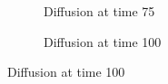 \documentclass[paper=a4, fontsize=11pt]{scrartcl} %
\numberwithin{equation}{section} %
\numberwithin{figure}{section} %
\numberwithin{table}{section} %
\begin{document}
\begin{figure}[H]
\begin{subfigure}[b]{0.45\textwidth}
		\noindent{}
	\caption{Diffusion at time 75}
	\end{subfigure}
	\hspace{5mm}
	\begin{subfigure}[b]{0.45\textwidth}
		\noindent{}
	\caption{Diffusion at time 100}
	\end{subfigure}
\end{figure}
\end{document}
